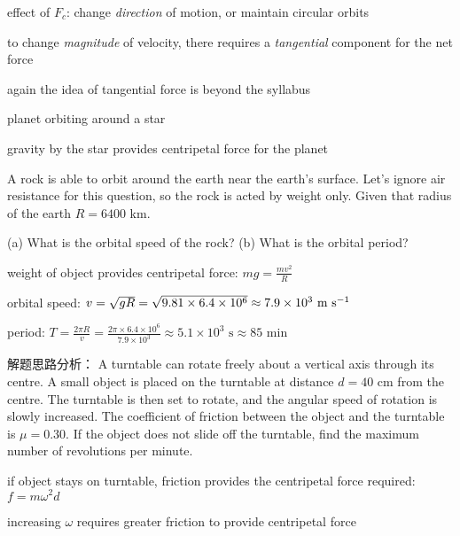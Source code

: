 \documentclass[a4paper,11pt]{article}
\newcounter{question}[section]
\newcommand{\cmt}{\noindent\hspace{-0.25em}\textcolor{Green}{\ding{226}} \hspace{0.2em}}
\newcommand{\sol}{\noindent\hspace{-0.12em}\textcolor{cyan}{\ding{45}} \hspace{0.2em}}
\numberwithin{equation}{section}
\numberwithin{figure}{section}
\begin{document}
\begin{reidai}

\begin{wrapfigure}{r}{5.6cm}
\centering
\vspace*{-80pt}
\end{wrapfigure}


\cmt effect of $F_c$: change \emph{direction} of motion, or maintain circular orbits

to change \emph{magnitude} of velocity, there requires a \emph{tangential} component for the net force

again the idea of tangential force is beyond the syllabus

planet orbiting around a star

\tcblower

gravity by the star provides centripetal force for the planet


A rock is able to orbit around the earth near the earth's surface. Let's ignore air resistance for this question, so the rock is acted by weight only. Given that radius of the earth $R=6400$ km. 

\end{reidai}

(a) What is the orbital speed of the rock? (b) What is the orbital period?

\sol weight of object provides centripetal force: $mg = \frac{mv^2}{R}$
	
orbital speed: $v = \sqrt{gR} = \sqrt{9.81\times6.4\times10^6} \approx 7.9\times10^3 \text{ m s$^{-1}$}$

period: $T = \frac{2\pi R}{v} = \frac{2\pi\times6.4\times10^6}{7.9\times10^3} \approx 5.1\times10^3 \text{ s} \approx 85 \text{ min}$ \eoe

\begin{ascolorbox8}{解题思路分析：}
A turntable can rotate freely about a vertical axis through its centre. A small object is placed on the turntable at distance $d=40$ cm from the centre. The turntable is then set to rotate, and the angular speed of rotation is slowly increased. The coefficient of friction between the object and the turntable is $\mu = 0.30$. If the object does not slide off the turntable, find the maximum number of revolutions per minute.

\sol if object stays on turntable, friction provides the centripetal force required: $f = m\omega^2 d$

increasing $\omega$ requires greater friction to provide centripetal force
\end{ascolorbox8}
\end{document}

